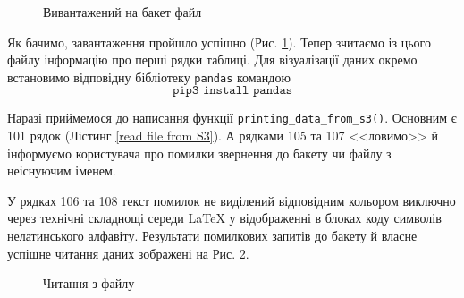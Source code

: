 \documentclass[a4paper,14pt]{extarticle} %
\begin{document}
\begin{figure}[H]
    \caption{Вивантажений на бакет файл}
    \label{fig:S3:upload a file}
\end{figure}

Як бачимо, завантаження пройшло успішно (Рис. \ref{fig:S3:upload a file}). Тепер зчитаємо із цього файлу інформацію 
про перші рядки таблиці. Для візуалізації даних окремо встановимо відповідну бібліотеку \texttt{pandas} командою
\[ \texttt{pip3 install pandas} \]

Наразі приймемося до написання функції \texttt{printing\_data\_from\_s3()}. Основним є 101 рядок 
(Лістинг \ref{read file from S3}). А рядками 105 та 107 <<ловимо>> й інформуємо користувача про помилки 
звернення до бакету чи файлу з неіснуючим іменем. 



У рядках 106 та 108 текст помилок не виділений відповідним кольором виключно через технічні складнощі середи 
\LaTeX{} у відображенні в блоках коду символів нелатинського алфавіту. Результати помилкових запитів до бакету 
й власне успішне читання даних зображені на Рис. \ref{fig:S3:read a file}.

\begin{figure}[H]
    \caption{Читання з файлу}
    \label{fig:S3:read a file}
\end{figure}
\end{document}
